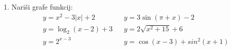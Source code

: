 \documentclass[a4paper,12pt]{article}
\begin{document}
\begin{enumerate}
\item Nariši grafe funkcij:
 \begin{equation*}
    \begin{aligned}
        &y=x^2 - 3|x| + 2 &  &y=3\sin(\pi + x) - 2 \\
        &y=\log_2 (x - 2) + 3 & &y= 2\sqrt{x^2 + 15} + 6 \\
        &y=2^{x-3} & &y=\cos(x - 3) + sin^2(x+1)  
    \end{aligned}
 \end{equation*}             

\end{enumerate}
\end{document}
